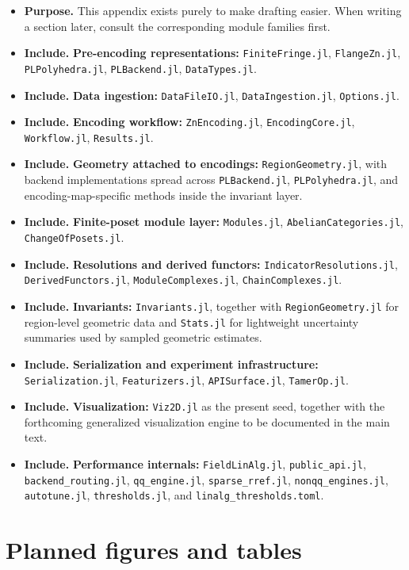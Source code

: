 \documentclass[11pt]{article}
\newenvironment{plan}{\begin{itemize}[leftmargin=1.6em,itemsep=0.35em,topsep=0.25em]}{\end{itemize}}
\newcommand{\purpose}[1]{\item \textbf{Purpose.} #1}
\newcommand{\includeitems}[1]{\item \textbf{Include.} #1}
\begin{document}
\begin{plan}
    \purpose{This appendix exists purely to make drafting easier. When writing a section later, consult the corresponding module families first.}
    \includeitems{\textbf{Pre-encoding representations:} \texttt{FiniteFringe.jl}, \texttt{FlangeZn.jl}, \texttt{PLPolyhedra.jl}, \texttt{PLBackend.jl}, \texttt{DataTypes.jl}.}
    \includeitems{\textbf{Data ingestion:} \texttt{DataFileIO.jl}, \texttt{DataIngestion.jl}, \texttt{Options.jl}.}
    \includeitems{\textbf{Encoding workflow:} \texttt{ZnEncoding.jl}, \texttt{EncodingCore.jl}, \texttt{Workflow.jl}, \texttt{Results.jl}.}
    \includeitems{\textbf{Geometry attached to encodings:} \texttt{RegionGeometry.jl}, with backend implementations spread across \texttt{PLBackend.jl}, \texttt{PLPolyhedra.jl}, and encoding-map-specific methods inside the invariant layer.}
    \includeitems{\textbf{Finite-poset module layer:} \texttt{Modules.jl}, \texttt{AbelianCategories.jl}, \texttt{ChangeOfPosets.jl}.}
    \includeitems{\textbf{Resolutions and derived functors:} \texttt{IndicatorResolutions.jl}, \texttt{DerivedFunctors.jl}, \texttt{ModuleComplexes.jl}, \texttt{ChainComplexes.jl}.}
    \includeitems{\textbf{Invariants:} \texttt{Invariants.jl}, together with \texttt{RegionGeometry.jl} for region-level geometric data and \texttt{Stats.jl} for lightweight uncertainty summaries used by sampled geometric estimates.}
    \includeitems{\textbf{Serialization and experiment infrastructure:} \texttt{Serialization.jl}, \texttt{Featurizers.jl}, \texttt{APISurface.jl}, \texttt{TamerOp.jl}.}
    \includeitems{\textbf{Visualization:} \texttt{Viz2D.jl} as the present seed, together with the forthcoming generalized visualization engine to be documented in the main text.}
    \includeitems{\textbf{Performance internals:} \texttt{FieldLinAlg.jl}, \texttt{public\_api.jl}, \texttt{backend\_routing.jl}, \texttt{qq\_engine.jl}, \texttt{sparse\_rref.jl}, \texttt{nonqq\_engines.jl}, \texttt{autotune.jl}, \texttt{thresholds.jl}, and \texttt{linalg\_thresholds.toml}.}
\end{plan}

\section{Planned figures and tables}\label{app:figures}
\end{document}
